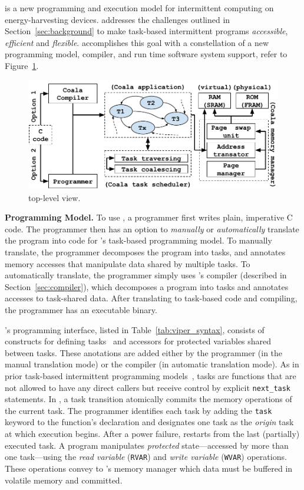 \sys is a new programming and execution model for intermittent computing on energy-harvesting devices. \sys addresses the challenges outlined in Section~\ref{sec:background} to make task-based intermittent programs {\em accessible}, {\em efficient} and {\em flexible}. \sys accomplishes this goal with a constellation of a new programming model, compiler, and run time software system support, refer to Figure~\ref{fig:system_overview}.

\begin{figure}
	\centering
	\includegraphics[width=\columnwidth]{figures/viper_block_diagram.pdf}
	\caption{\sys top-level view.}
	\label{fig:system_overview}
\end{figure}

\textbf{\sys Programming Model.} To use \sys, a programmer first writes plain, imperative C code. The programmer then has an option to {\em manually} or {\em automatically} translate the program into code for \sys's task-based programming model. To manually translate, the programmer decomposes the program into tasks, and annotates memory accesses that manipulate data shared by multiple tasks. To automatically translate, the programmer simply uses \sys's compiler (described in Section~\ref{sec:compiler}), which decomposes a program into tasks and annotates accesses to task-shared data. After translating to task-based code and compiling, the programmer has an executable \sys binary.

\sys's programming interface, listed in Table~\ref{tab:viper_syntax}, consists of
constructs for defining tasks~\cite{chain,alpaca} and accessors for
protected variables shared between tasks. These anotations are added either by
the programmer (in the manual translation mode) or the compiler (in automatic
translation mode). As in prior task-based intermittent programming
models~\cite{chain,alpaca}, tasks are functions that are not allowed to have
any direct callers but receive control by explicit {\tt next\_task} statements.
In \sys, a task transition atomically commits the memory operations of the
current task.  The programmer identifies each task by adding the {\tt task}
keyword to the function's declaration and designates one task as the {\em
origin} task at which execution begins. After a power failure,
\sys restarts from the last (partially) executed task.
%
A \sys program manipulates {\em protected} state---accessed by more than one
task---using the \emph{read variable} ({\tt RVAR}) and \emph{write variable}
({\tt WVAR}) operations. These operations convey to \sys's memory manager which
data must be buffered in volatile memory and committed.

